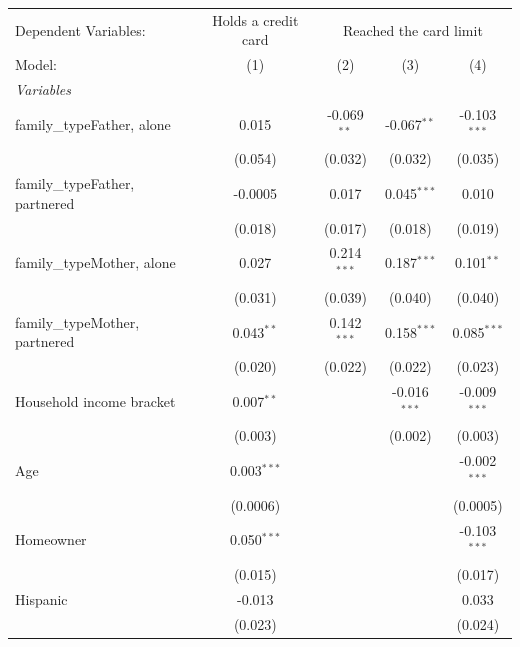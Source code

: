 
\begingroup
\centering
\begin{tabular}{lcccc}
   \tabularnewline \midrule \midrule
   Dependent Variables: & Holds a credit card & \multicolumn{3}{c}{Reached the card limit}\\
   Model:                         & (1)           & (2)           & (3)            & (4)\\  
   \midrule
   \emph{Variables}\\
   family\_typeFather, alone      & 0.015         & -0.069$^{**}$ & -0.067$^{**}$  & -0.103$^{***}$\\   
                                  & (0.054)       & (0.032)       & (0.032)        & (0.035)\\   
   family\_typeFather, partnered  & -0.0005       & 0.017         & 0.045$^{***}$  & 0.010\\   
                                  & (0.018)       & (0.017)       & (0.018)        & (0.019)\\   
   family\_typeMother, alone      & 0.027         & 0.214$^{***}$ & 0.187$^{***}$  & 0.101$^{**}$\\   
                                  & (0.031)       & (0.039)       & (0.040)        & (0.040)\\   
   family\_typeMother, partnered  & 0.043$^{**}$  & 0.142$^{***}$ & 0.158$^{***}$  & 0.085$^{***}$\\   
                                  & (0.020)       & (0.022)       & (0.022)        & (0.023)\\   
   Household income bracket       & 0.007$^{**}$  &               & -0.016$^{***}$ & -0.009$^{***}$\\   
                                  & (0.003)       &               & (0.002)        & (0.003)\\   
   Age                            & 0.003$^{***}$ &               &                & -0.002$^{***}$\\   
                                  & (0.0006)      &               &                & (0.0005)\\   
   Homeowner                      & 0.050$^{***}$ &               &                & -0.103$^{***}$\\   
                                  & (0.015)       &               &                & (0.017)\\   
   Hispanic                       & -0.013        &               &                & 0.033\\   
                                  & (0.023)       &               &                & (0.024)\\   

\end{tabular}

